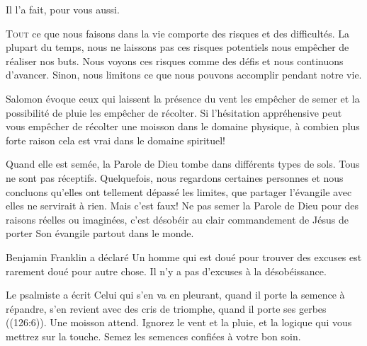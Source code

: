 Il l'a fait, pour vous aussi.

\dvrule






\lettrine{T}{out} ce que nous faisons dans la vie
 comporte des risques et des difficultés.
 La plupart du temps, nous ne laissons pas ces risques potentiels
 nous empêcher de réaliser nos buts.
 Nous voyons ces risques comme des défis et nous continuons d'avancer.
 Sinon, nous limitons ce que nous pouvons accomplir pendant notre vie. 

Salomon évoque ceux qui laissent la présence du vent les empêcher
 de semer et la possibilité de pluie les empêcher de récolter.
 Si l'hésitation appréhensive peut vous empêcher de récolter
 une moisson dans le domaine physique, à combien plus forte raison
 cela est vrai dans le domaine spirituel! 

Quand elle est semée, la Parole de Dieu tombe dans différents types de sols.
 Tous ne sont pas réceptifs.
 Quelquefois, nous regardons certaines personnes et nous concluons
 qu'elles ont tellement dépassé les limites, que partager l'évangile 
 avec elles ne servirait à rien. Mais c'est faux!
 Ne pas semer la Parole de Dieu pour des raisons réelles ou imaginées,
 c'est désobéir au clair commandement de Jésus de porter Son évangile 
 partout dans le monde. 

Benjamin Franklin a déclaré\frcolon{} 
 \Og Un homme qui est doué pour trouver des excuses est rarement doué
 pour autre chose. \Fg{} Il n'y a pas d'excuses à la désobéissance. 


Le psalmiste a écrit\frcolon{} 
 \Og Celui qui s'en va en pleurant, quand il porte la semence à répandre,
 s'en revient avec des cris de triomphe, quand il porte ses gerbes \Fg{} 
 ((126:6)). Une moisson attend. Ignorez le vent et la pluie,
 et la logique qui vous mettrez sur la touche.
 Semez les semences confiées à votre bon soin.

